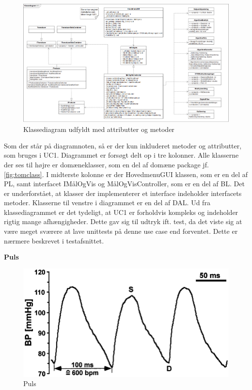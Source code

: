 \clearpage
\begin{figure}[h!]
	\centering
	\includegraphics[width=1\linewidth]{Arkitektur_og_design/Softwarearkitektur/classdiagram}	
	\caption{Klassediagram udfyldt med attributter og metoder}
	\label{fig:classdiagram}
\end{figure}
\vspace{0.5 cm}

Som der står på diagramnoten, så er der kun inkluderet metoder og attributter, som bruges i UC1. Diagrammet er forsøgt delt op i tre kolonner. Alle klasserne der ses til højre er domæneklasser, som en del af domæne package jf. \vref{fig:tomclass}. I midterste kolonne er der HovedmenuGUI klassen, som er en del af PL, samt interfacet IMålOgVis og MålOgVisController, som er en del af BL. Det er underforstået, at klasser der implementerer et interface indeholder interfacets metoder. Klasserne til venstre i diagrammet er en del af DAL. Ud fra klassediagrammet er det tydeligt, at UC1 er forholdvis kompleks og indeholder rigtig mange afhængigheder. Dette gav sig til udtryk ift. test, da det viste sig at være meget sværere at lave unittests på denne use case end forventet. Dette er nærmere beskrevet i testafsnittet.

\clearpage
\vspace{1 cm}
\textbf{Puls}

\begin{figure}[h!]
	\centering
	\includegraphics[width=0.5\linewidth]{Arkitektur_og_design/Softwarearkitektur/puls}	
	\caption{Puls}
	\label{fig:puls}
\end{figure}

